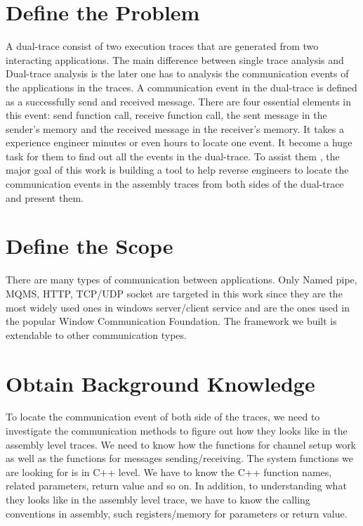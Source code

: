 \label{chapter:problem}

\newlength{\savedunitlength}
\setlength{\unitlength}{2em}
\section{Define the Problem}
A dual-trace consist of two execution traces that are generated from two interacting applications. The main difference between single trace analysis and Dual-trace analysis is the later one has to analysis the communication events of the applications in the traces. A communication event in the dual-trace is defined as a successfully send and received message. There are four essential elements in this event: send function call, receive function call, the sent message in the sender's memory and the received message in the receiver's memory. It takes a experience engineer minutes or even hours to locate one event. It become a huge task for them to find out all the events in the dual-trace. To assist them , the major goal of this work is building a tool to help reverse engineers to locate the communication events in the assembly traces from both sides of the dual-trace and present them. \par


\section{Define the Scope}
There are many types of communication between applications. Only Named pipe, MQMS, HTTP, TCP/UDP socket are targeted in this work since they are the most widely used ones in windows server/client service and are the ones used in the popular Window Communication Foundation. The framework we built is extendable to other communication types.

\section{Obtain Background Knowledge}
To locate the communication event of both side of the traces, we need to investigate the communication methods to figure out how they looks like in the assembly level traces. We need to know how the functions for channel setup work as well as the functions for messages sending/receiving. The system functions we are looking for is in C++ level. We have to know the C++ function names, related parameters, return value and so on.  In addition, to understanding what they looks like in the assembly level trace, we have to know the calling conventions in assembly, such registers/memory for parameters or return value.

